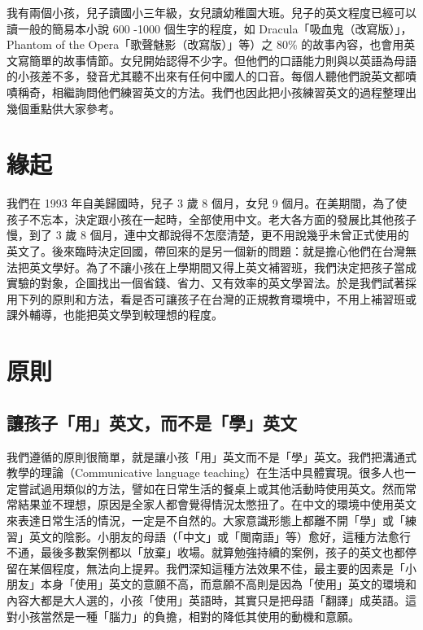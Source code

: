 我有兩個小孩，兒子讀國小三年級，女兒讀幼稚園大班。兒子的英文程度已經可以讀一般的簡易本小說 600 -1000 個生字的程度，如  Dracula「吸血鬼（改寫版）」，Phantom of the Opera「歌聲魅影（改寫版）」等）之 80\%  的故事內容，也會用英文寫簡單的故事情節。女兒開始認得不少字。但他們的口語能力則與以英語為母語的小孩差不多，發音尤其聽不出來有任何中國人的口音。每個人聽他們說英文都嘖嘖稱奇，相繼詢問他們練習英文的方法。我們也因此把小孩練習英文的過程整理出幾個重點供大家參考。


\section{緣起}
我們在 1993 年自美歸國時，兒子 3 歲 8 個月，女兒 9 個月。在美期間，為了使孩子不忘本，決定跟小孩在一起時，全部使用中文。老大各方面的發展比其他孩子慢，到了 3 歲 8 個月，連中文都說得不怎麼清楚，更不用說幾乎未曾正式使用的英文了。後來臨時決定回國，帶回來的是另一個新的問題：就是擔心他們在台灣無法把英文學好。為了不讓小孩在上學期間又得上英文補習班，我們決定把孩子當成實驗的對象，企圖找出一個省錢、省力、又有效率的英文學習法。於是我們試著採用下列的原則和方法，看是否可讓孩子在台灣的正規教育環境中，不用上補習班或課外輔導，也能把英文學到較理想的程度。

\section{原則}
\subsection{讓孩子「用」英文，而不是「學」英文}
我們遵循的原則很簡單，就是讓小孩「用」英文而不是「學」英文。我們把溝通式教學的理論（Communicative language teaching）在生活中具體實現。很多人也一定嘗試過用類似的方法，譬如在日常生活的餐桌上或其他活動時使用英文。然而常常結果並不理想，原因是全家人都會覺得情況太憋扭了。在中文的環境中使用英文來表達日常生活的情況，一定是不自然的。大家意識形態上都離不開「學」或「練習」英文的陰影。小朋友的母語（「中文」或「閩南語」等）愈好，這種方法愈行不通，最後多數案例都以「放棄」收場。就算勉強持續的案例，孩子的英文也都停留在某個程度，無法向上提昇。我們深知這種方法效果不佳，最主要的因素是「小朋友」本身「使用」英文的意願不高，而意願不高則是因為「使用」英文的環境和內容大都是大人選的，小孩「使用」英語時，其實只是把母語「翻譯」成英語。這對小孩當然是一種「腦力」的負擔，相對的降低其使用的動機和意願。

